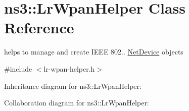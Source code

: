 \hypertarget{classns3_1_1LrWpanHelper}{}\section{ns3\+:\+:Lr\+Wpan\+Helper Class Reference}
\label{classns3_1_1LrWpanHelper}


helps to manage and create I\+E\+EE 802.. \hyperlink{classns3_1_1NetDevice}{Net\+Device} objects  




{\ttfamily \#include $<$lr-\/wpan-\/helper.\+h$>$}



Inheritance diagram for ns3\+:\+:Lr\+Wpan\+Helper\+:


Collaboration diagram for ns3\+:\+:Lr\+Wpan\+Helper\+:
